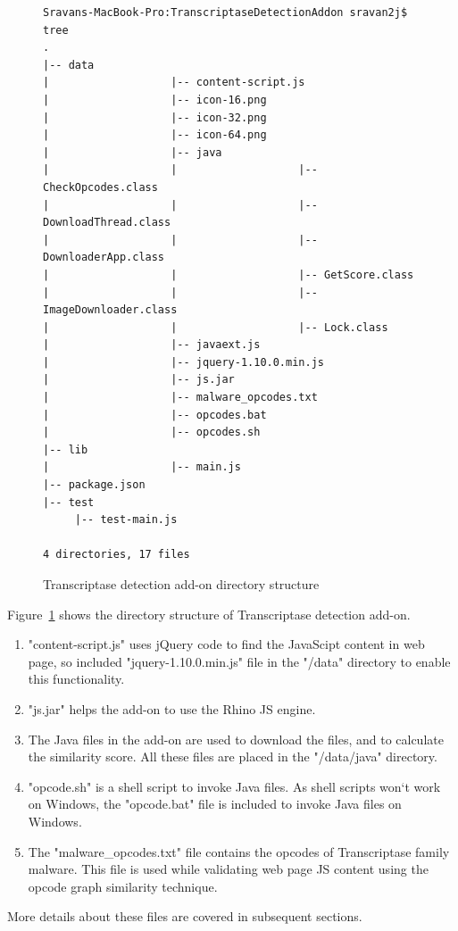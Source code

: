 \begin{figure}[h]
  \centering
\begin{lstlisting}[style=BashInputStyle,numbers=none,mathescape=false,tabsize=4,keywords=none]
Sravans-MacBook-Pro:TranscriptaseDetectionAddon sravan2j$ tree
.
|-- data
|  	  	  	  	   	|-- content-script.js
|  	  	  	  	   	|-- icon-16.png
|  	  	  	   	   	|-- icon-32.png
|  	  	  	  	   	|-- icon-64.png
|  	  	  	  	   	|-- java
|  	  	  	  	   	|  	  	  	  	   	|-- CheckOpcodes.class
|  	  	  	  	   	|  	  	  	  	   	|-- DownloadThread.class
|  	  	  	  	   	|  	  	  	  	   	|-- DownloaderApp.class
|  	  	  	  	   	|  	  	  	  	   	|-- GetScore.class
|  	  	  	  	   	|  	  	  	  	   	|-- ImageDownloader.class
|  	  	  	  	   	|  	  	  	  	   	|-- Lock.class
|  	  	  	  	   	|-- javaext.js
|  	  	  	  	   	|-- jquery-1.10.0.min.js
|  	  	  	  	   	|-- js.jar
|  	  	  	  	   	|-- malware_opcodes.txt
|  	  	  	  	   	|-- opcodes.bat
|  	  	  	  	   	|-- opcodes.sh
|-- lib
|  	  	  	  	   	|-- main.js
|-- package.json
|-- test
  	 |-- test-main.js
	
4 directories, 17 files
\end{lstlisting}
    \caption[Transcriptase detection add-on directory structure]{Transcriptase detection add-on directory structure}
    \label{fig:transdetectaddon}
\end{figure}
Figure~\ref{fig:transdetectaddon} shows the directory structure of Transcriptase detection add-on. 
\begin{enumerate}
\item "content-script.js" uses jQuery code to find the JavaScipt content in web page, so included "jquery-1.10.0.min.js" file in the "/data" directory to enable this functionality. 
\item "js.jar" helps the add-on to use the Rhino JS engine.
\item The Java files in the add-on are used to download the files, and to calculate the similarity score. All these files are placed in the "/data/java" directory.
\item "opcode.sh" is a shell script to invoke Java files. As shell scripts won`t work on Windows, the "opcode.bat" file is included to invoke Java files on Windows. 
\item The "malware\_opcodes.txt" file contains the opcodes of Transcriptase family malware. This file is used while validating web page JS content using the opcode graph similarity technique. 
\end{enumerate}
More details about these files are covered in subsequent sections.

